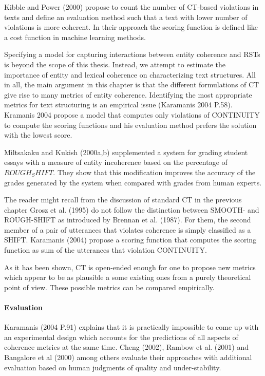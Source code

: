 Kibble and Power (2000) propose to count the number of CT-based violations in texts and define an evaluation method such that a text with lower number of violations is more coherent. 
In their approach the scoring function is defined like a cost function in machine learning methods.

Specifying a model for capturing interactions between entity coherence and RSTs is beyond the scope of this thesis. Instead, we attempt to estimate the importance of entity and lexical coherence on characterizing text structures. 
All in all, the main argument in this chapter is that the different formulations of CT give rise to many metrics of entity coherence. Identifying the most appropriate metrics for text structuring is an empirical issue (Karamanis 2004 P.58).
Kramanis 2004 propose a model that computes only violations of CONTINUITY to compute the scoring functions and his evaluation method prefers the solution with the lowest score. 

Miltsakaku and Kukish (2000a,b) supplemented a system for grading student essays with a measure of entity incoherence based on the percentage of $ROUGH_SHIFT$. 
They show that this modification improves the accuracy of the grades generated by the system when compared with grades from human experts. 

The reader might recall from the discussion of standard CT in the previous chapter Grosz et al. (1995) do not follow the distinction between SMOOTH- and ROUGH-SHIFT as introduced by Brennan et al. (1987). 
For them, the second member of a pair of utterances that violates coherence is simply classified as a SHIFT. 
Karamanis (2004) propose a scoring function that computes the scoring function as sum of the utterances that violation CONTINUITY. 

As it has been shown, CT is open-ended enough for one to propose new metrics which appear to be as plausible a some existing ones from a purely theoretical point of view. 
These possible metrics can be compared empirically. 

\paragraph{Evaluation} 
Karamanis (2004 P.91) explains that it is practically impossible to come up with an experimental design which accounts for the predictions of all aspects of coherence metrics at the same time. 
Cheng (2002), Rambow et al. (2001) and Bangalore et al (2000) among others evaluate their approaches with additional evaluation based on human judgments of quality and under-stability. 

